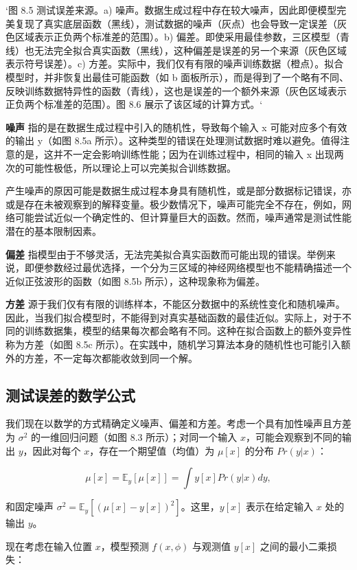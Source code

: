 `图 8.5 测试误差来源。a) 噪声。数据生成过程中存在较大噪声，因此即便模型完美复现了真实底层函数（黑线），测试数据的噪声（灰点）也会导致一定误差（灰色区域表示正负两个标准差的范围）。b) 偏差。即使采用最佳参数，三区模型（青线）也无法完全拟合真实函数（黑线），这种偏差是误差的另一个来源（灰色区域表示符号误差）。c) 方差。实际中，我们仅有有限的噪声训练数据（橙点）。拟合模型时，并非恢复出最佳可能函数（如 b 面板所示），而是得到了一个略有不同、反映训练数据特异性的函数（青线），这也是误差的一个额外来源（灰色区域表示正负两个标准差的范围）。图 8.6 展示了该区域的计算方式。`

\textbf{噪声} 指的是在数据生成过程中引入的随机性，导致每个输入 x 可能对应多个有效的输出 y（如图 8.5a 所示）。这种类型的错误在处理测试数据时难以避免。值得注意的是，这并不一定会影响训练性能；因为在训练过程中，相同的输入 x 出现两次的可能性极低，所以理论上可以完美拟合训练数据。

产生噪声的原因可能是数据生成过程本身具有随机性，或是部分数据标记错误，亦或是存在未被观察到的解释变量。极少数情况下，噪声可能完全不存在，例如，网络可能尝试近似一个确定性的、但计算量巨大的函数。然而，噪声通常是测试性能潜在的基本限制因素。

\textbf{偏差} 指模型由于不够灵活，无法完美拟合真实函数而可能出现的错误。举例来说，即便参数经过最优选择，一个分为三区域的神经网络模型也不能精确描述一个近似正弦波形的函数（如图 8.5b 所示），这种现象称为偏差。

\textbf{方差} 源于我们仅有有限的训练样本，不能区分数据中的系统性变化和随机噪声。因此，当我们拟合模型时，不能得到对真实基础函数的最佳近似。实际上，对于不同的训练数据集，模型的结果每次都会略有不同。这种在拟合函数上的额外变异性称为方差（如图 8.5c 所示）。在实践中，随机学习算法本身的随机性也可能引入额外的方差，不一定每次都能收敛到同一个解。
\subsection{测试误差的数学公式}
我们现在以数学的方式精确定义噪声、偏差和方差。考虑一个具有加性噪声且方差为 \(\sigma^2\) 的一维回归问题（如图 8.3 所示）；对同一个输入 \(x\)，可能会观察到不同的输出 \(y\)，因此对每个 \(x\)，存在一个期望值（均值）为 \(\mu[x]\) 的分布 \(Pr(y|x)\)：

\[
\mu[x] = \mathbb{E}_y[\mu[x]] = \int y[x] Pr(y|x)dy, \tag{8.1}
\]

和固定噪声 \(\sigma^2 = \mathbb{E}_y [(\mu[x] - y[x])^2]\)。这里，\(y[x]\) 表示在给定输入 \(x\) 处的输出 \(y\)。

现在考虑在输入位置 \(x\)，模型预测 \(f(x, \phi)\) 与观测值 \(y[x]\) 之间的最小二乘损失：


